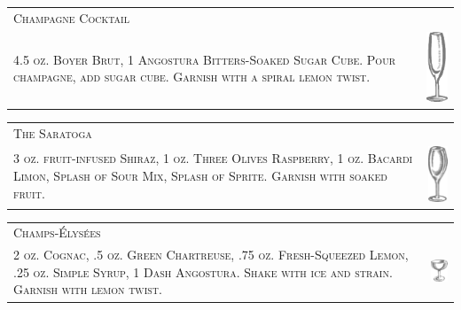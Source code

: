 \documentclass{article}
\begin{document}
\begin{tabular}{b{2.5in} m{0.625in}}
  \multicolumn{2}{p{3.0in}}{\centering\Huge\textsc{Champagne Cocktail}} \\ 
  
  \textsc{4.5 oz. Boyer Brut, 1 Angostura Bitters-Soaked Sugar
    Cube. Pour champagne, add sugar cube.  Garnish with a spiral lemon
    twist.} & \includegraphics[width=0.5in]{flute.png}
\end{tabular}

\begin{tabular}{b{2.5in} m{0.625in}}
  \multicolumn{2}{p{3.0in}}{\centering\Huge\textsc{The Saratoga}} \\ 
  
  \textsc{3 oz. fruit-infused Shiraz, 1 oz. Three Olives Raspberry, 1
    oz. Bacardi Limon, Splash of Sour Mix, Splash of Sprite. Garnish
    with soaked fruit.} &
  \includegraphics[width=0.5in]{wine_glass.png}
\end{tabular}

\begin{tabular}{b{2.5in} m{0.625in}}
  \multicolumn{2}{p{3.0in}}{\centering\Huge\textsc{Champs-\'{E}lys\'{e}es}} \\ 
  
  \textsc{2 oz. Cognac, .5 oz. Green Chartreuse, .75 oz.
    Fresh-Squeezed Lemon, .25 oz. Simple Syrup, 1 Dash
    Angostura. Shake with ice and strain.  Garnish with lemon twist.}
  & \includegraphics[width=0.5in]{egg_coupe.png}
\end{tabular}
\end{document}
